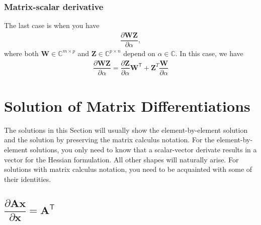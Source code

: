 \documentclass{article}
\newcommand{\trans}{\mathsf{T}}
\begin{document}
\subsubsection{Matrix-scalar derivative}
The last case is when you have
\begin{align}
    \dfrac{\partial \mathbf{W}\mathbf{Z}}{\partial \alpha},
\end{align}
where both \(\mathbf{W} \in \mathbb{C}^{m \times p}\) and \(\mathbf{Z} \in \mathbb{C}^{p\times n}\) depend on \(\alpha \in \mathbb{C}\). In this case, we have
\begin{align}
    \label{eq:matrix-matrix-product-rule}
    \dfrac{\partial \mathbf{W}\mathbf{Z}}{\partial \alpha} = \dfrac{\partial \mathbf{Z}}{\partial \alpha}\mathbf{W}^{\trans} + \mathbf{Z}^{T} \dfrac{\mathbf{W}}{\partial \alpha}
\end{align}


\section{Solution of Matrix Differentiations}\label{sec:diff}
The solutions in this Section will usually show the element-by-element solution and the solution by preserving the matrix calculus notation. For the element-by-element solutions, you only need to know that a scalar-vector derivate results in a vector for the Hessian formulation. All other shapes will naturally arise. For solutions with matrix calculus notation, you need to be acquainted with some of their identities.

\subsection{\(\dfrac{\partial \mathbf{A} \mathbf{x}}{\partial \mathbf{x}} = \mathbf{A}^\trans\)}
\end{document}
